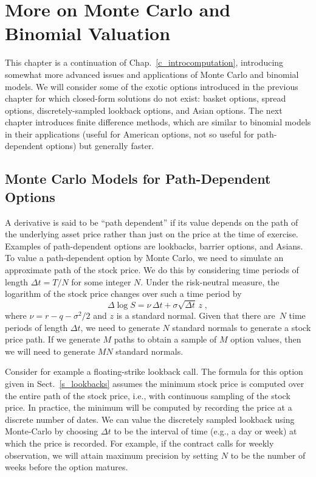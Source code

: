 \chapter{More on Monte Carlo and Binomial Valuation}\label{c_montecarlo}

This chapter is a continuation of Chap.~\ref{c_introcomputation}, introducing somewhat more advanced issues and applications of Monte Carlo and binomial models.  We will consider some of the exotic options introduced in the previous chapter for which closed-form solutions do not exist: basket options, spread options, discretely-sampled lookback options, and Asian options.  The next chapter introduces finite difference methods, which are similar to binomial models in their applications (useful for American options, not so useful for path-dependent options) but generally faster.  
    

\section{Monte Carlo Models for Path-Dependent Options}
A derivative is said to be ``path dependent''  if its value depends on the path of the underlying asset price rather than just on the  price at the time of exercise.  Examples of path-dependent options are lookbacks, barrier options, and Asians.
To value a path-dependent option by Monte Carlo, we need to simulate an approximate path of the stock price.  We do this by considering time periods of length $\varDelta t = T/N$ for some integer $N$.  Under the risk-neutral measure, the logarithm of the stock price changes over such a time period by
\begin{equation}\label{pathdependent}
\varDelta \log S = \nu\,\varDelta t + \sigma\sqrt{\varDelta t}\,z\;,
\end{equation}
where $\nu = r-q-\sigma^2/2$ and $z$ is a standard normal.  Given that there are~$N$ time periods of length $\varDelta t$, we need to generate $N$ standard normals to generate a stock price path.  If we generate $M$ paths to obtain a sample of $M$ option values, then we will need to generate $MN$ standard normals.  


Consider for example a floating-strike lookback call.   The formula for this option given in Sect.~\ref{s_lookbacks} assumes the minimum stock price is computed over the entire path of the stock price, i.e., with continuous sampling of the stock price.  In practice, the minimum will be computed by recording the price at a discrete number of dates.  We can value the discretely sampled lookback using Monte-Carlo by choosing $\varDelta t$ to be the interval of time (e.g., a day or week) at which the price is recorded.  For example, if the contract calls for weekly observation, we will attain maximum precision by setting $N$ to be the number of weeks before the option matures.  


